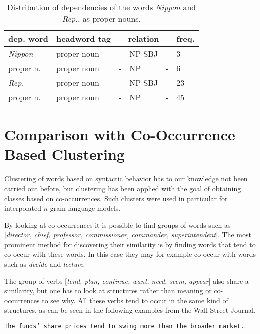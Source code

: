 \begin{table}[thbc]
\vspace*{-5mm}
\begin{center}
\caption{Distribution of dependencies of the words {\em Nippon} and 
{\em Rep.}, as proper nouns.}
\begin{tabular}{|l|l|lll|l|} \hline 
\multicolumn{1}{|c|}{dep. word} & headword tag & 
     \multicolumn{3}{|c|}{relation} & freq. \\ \hline \hline
{\em Nippon} &  proper noun & - & NP-SBJ & - &3 \\ \cline{2-6}
proper n.  &  proper noun  & - & NP & - & 6 \\ \hline  \hline
{\em Rep.} &  proper noun  & - & NP-SBJ & - & 23 \\ \cline{2-6}
proper n. & proper noun  & - & NP & - & 45  \\ \hline
\end{tabular}
\label{nippon}
\end{center}
\end{table}

\section{Comparison with Co-Occurrence Based Clustering}

Clustering of words based on syntactic behavior has to our knowledge not been
carried out before, but clustering has been applied with the goal of obtaining
classes based on co-occurrences. Such clusters were used in particular for
interpolated $n$-gram language models.

By looking at co-occurrences it is possible to find groups of words such as
[{\em director, chief, professor, commissioner, commander, superintendent}].
The most prominent method for discovering their similarity is by finding words
that tend to co-occur with these words. In this case they may for example
co-occur with words such as {\em decide} and {\em lecture}.

The group of verbs [{\em tend, plan, continue, want, need, seem, appear}] also
share a similarity, but one has to look at structures rather than meaning or
co-occurrences to see why. All these verbs tend to occur in the same kind of
structures, as can be seen in the following examples from the Wall Street
Journal.

\hspace*{4mm}
{\tt The funds' share prices tend to swing more than the broader market.}

